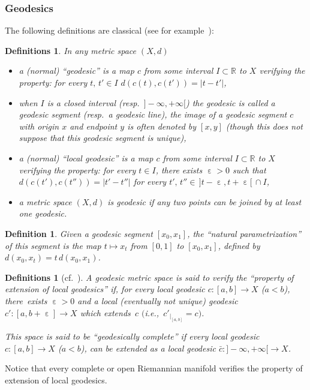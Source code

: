 \documentclass[10pt,a4paper]{amsart}
\numberwithin{equation}{section}
\newtheorem{defi}[theor]{Definition}
\newtheorem{defis}[theor]{Definitions}
\newcommand{\R}{\mathbb{R}}
\newcommand{\e}{\operatorname{\varepsilon}}
\begin{document}
\subsubsection{Geodesics}\label{geodesics}
The following definitions are classical (see for example~\cite[D\'efinitions~I.1.3, p.~4]{BH}):
\begin{defis}
In any metric space $ (X,d)$
\begin{itemize}\itemsep=0pt
\item a (normal) ``geodesic'' is a map $c$ from some interval $I \subset \R$ to $X$ verifying the property: for every $ t, \, t' \in I$
$ d(c(t), c(t')) = |t - t'|$,

\item when $I$ is a closed interval (resp.\ $]{-}\infty, + \infty [$) the geodesic is called a geodesic segment
(resp.\ a geodesic line), the image of a geodesic segment $ c $ with origin $x$ and endpoint $y$ is often denoted by $[x, y]$
(though this does not suppose that this geodesic segment is unique),

\item a (normal) ``local geodesic'' is a map $c$ from some interval
$I \subset \R$ to $X$ verifying the property: for every $ t \in I$,
there exists $\e > 0$ such that $ d(c(t'), c(t'')) = |t' - t''|$ for every $ t', \, t'' \in \, ]t- \e, t+ \e[\,\cap I$,

\item a metric space $(X,d)$ is geodesic if any two points can be joined by at least one geodesic.
\end{itemize}
\end{defis}

\begin{defi}\label{naturalparameter}
Given a geodesic segment $[x_0, x_1]$, the ``natural parametrization'' of this segment is the map $t \mapsto x_t$ from $[0, 1]$ to $[x_0, x_1]$,
defined by $d(x_0, x_t) = t \, d(x_0, x_1)$.
\end{defi}

\begin{defis}[{cf.~\cite[Definition~II.5.7, p.~208]{BH}}]\label{geodextension}
A geodesic metric space is said to verify the ``property of extension of local geodesics'' if, for every local geodesic $c \colon [a,b] \to X$ ($a
< b$),
there~exists $\e > 0$ and a local (eventually not unique) geodesic $ c' \colon
[a,b+ \e ] \to X $ which extends~$c$ $\big($i.e.,~$ c'_{|_{[a,b]}} = c\big)$.

This space is said to be ``geodesically complete'' if every local geodesic $c\colon [a,b] \to X$ ($a < b$), can be extended as a local geodesic
$ \bar c\colon ]{-}\infty, +\infty[ {} \to X$.
\end{defis}
Notice that every complete or open Riemannian manifold verifies the property of extension of local geodesics.
\end{document}
